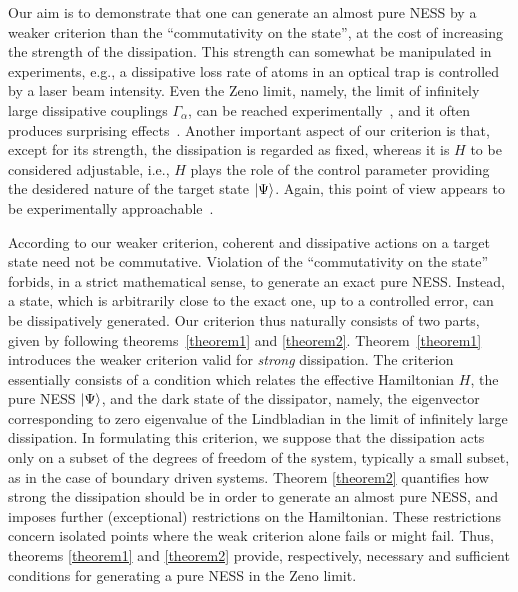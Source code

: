 \documentclass[aps,pra,letterpaper,twocolumn,showpacs,superscriptaddress,floatfix,longbibliography]{revtex4-1}
\begin{document}
Our aim is to demonstrate that one can generate an almost pure NESS by
a weaker criterion than the ``commutativity on the state'', at the
cost of increasing the strength of the dissipation. This strength can
somewhat be manipulated in experiments, e.g., a dissipative loss rate
of atoms in an optical trap is controlled by a laser beam intensity.
Even the Zeno limit, namely, the limit of infinitely large dissipative
couplings $\Gamma_\alpha$, can be reached
experimentally~\cite{ZenoStaticsExperimental, TonksgasScience,
  ZenoDynamicsExperimental, Signoles2014}, and it often produces
surprising
effects~\cite{Zeno,TonksgasNJP,TonksgasPRA2009,Zanardi2014PRL,Zanardi2015PRA}.
Another important aspect of our criterion is that, except for its
strength, the dissipation is regarded as fixed, whereas it is $H$ to
be considered adjustable, i.e., $H$ plays the role of the control
parameter providing the desidered nature of the target state
$|{\Psi}\rangle$.  Again, this point of view appears to be experimentally
approachable~\cite{2016OtteXXZ}.

According to our weaker criterion, coherent and dissipative actions on
a target state need not be commutative.  Violation of the
``commutativity on the state'' forbids, in a strict mathematical
sense, to generate an exact pure NESS. Instead, a state, which is
arbitrarily close to the exact one, up to a controlled error, can be
dissipatively generated.  Our criterion thus naturally consists of two
parts, given by following theorems~\ref{theorem1} and
\ref{theorem2}. Theorem~\ref{theorem1} introduces the weaker criterion
valid for \textit{strong} dissipation. The criterion essentially
consists of a condition which relates the effective Hamiltonian $H$,
the pure NESS $|{\Psi}\rangle$, and the dark state of the dissipator,
namely, the eigenvector corresponding to zero eigenvalue of the
Lindbladian in the limit of infinitely large dissipation.  In
formulating this criterion, we suppose that the dissipation acts only
on a subset of the degrees of freedom of the system, typically a small
subset, as in the case of boundary driven systems.  Theorem
\ref{theorem2} quantifies how strong the dissipation should be in
order to generate an almost pure NESS, and imposes further
(exceptional) restrictions on the Hamiltonian.  These restrictions
concern isolated points where the weak criterion alone fails or might
fail.  Thus, theorems \ref{theorem1} and \ref{theorem2} provide,
respectively, necessary and sufficient conditions for generating a
pure NESS in the Zeno limit.
\end{document}

